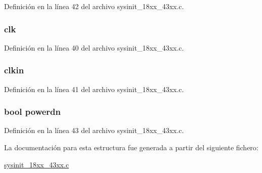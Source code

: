 Definición en la línea 42 del archivo sysinit\+\_\+18xx\+\_\+43xx.\+c.

\subsubsection[{\texorpdfstring{clk}{clk}}]{ clk}\hypertarget{struct_c_l_k___b_a_s_e___s_t_a_t_e_s_a45ff188655e503500c8d6a397ae42746}{}\label{struct_c_l_k___b_a_s_e___s_t_a_t_e_s_a45ff188655e503500c8d6a397ae42746}


Definición en la línea 40 del archivo sysinit\+\_\+18xx\+\_\+43xx.\+c.

\subsubsection[{\texorpdfstring{clkin}{clkin}}]{ clkin}\hypertarget{struct_c_l_k___b_a_s_e___s_t_a_t_e_s_a7bfb394ec7a201b4effc72376f929521}{}\label{struct_c_l_k___b_a_s_e___s_t_a_t_e_s_a7bfb394ec7a201b4effc72376f929521}


Definición en la línea 41 del archivo sysinit\+\_\+18xx\+\_\+43xx.\+c.

\subsubsection[{\texorpdfstring{powerdn}{powerdn}}]{\setlength{\rightskip}{0pt plus 5cm}bool powerdn}\hypertarget{struct_c_l_k___b_a_s_e___s_t_a_t_e_s_a7389c48dd958a2fc6e480ede1cc535b7}{}\label{struct_c_l_k___b_a_s_e___s_t_a_t_e_s_a7389c48dd958a2fc6e480ede1cc535b7}


Definición en la línea 43 del archivo sysinit\+\_\+18xx\+\_\+43xx.\+c.



La documentación para esta estructura fue generada a partir del siguiente fichero\+:\begin{DoxyCompactItemize}
\item 
\hyperlink{sysinit__18xx__43xx_8c}{sysinit\+\_\+18xx\+\_\+43xx.\+c}\end{DoxyCompactItemize}
